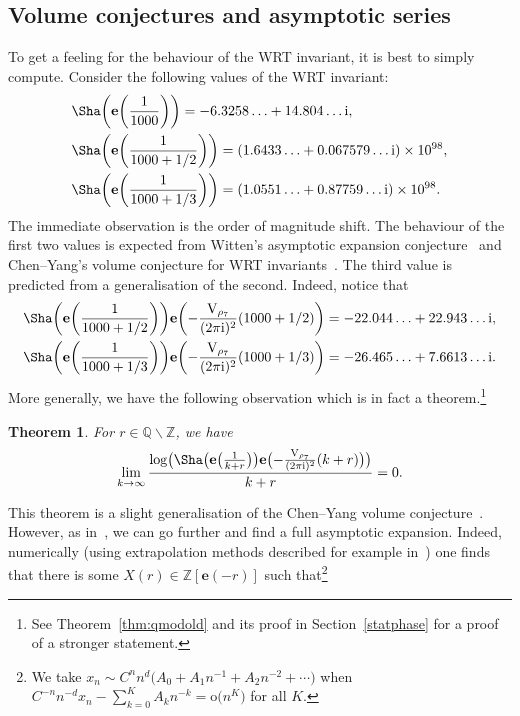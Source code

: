 \documentclass[pdftex]{sigma}
\numberwithin{equation}{section}
\newtheorem{Theorem}{Theorem}[section]
\def\BZ{\mathbb{Z}}
\def\BQ{\mathbb{Q}}
\def\e{\mathbf e}
\def\VC{\mathrm{VC}}
\def\WRT{\Sha}
\def\BZ{\mathbb Z}
\def\BQ{\mathbb Q}
\def\VC{\mathrm{V}}
\begin{document}
\subsection{Volume conjectures and asymptotic series}
\label{volconj}

To get a feeling for the behaviour of the WRT invariant, it is best to simply compute. Consider the following values of the WRT invariant:
\begin{align*}
& \WRT\biggl(\e\biggl(\frac{1}{1000}\biggr)\biggr) =-6.3258\ldots + 14.804\dots {\rm i} ,\\
& \WRT\biggl(\e\biggl(\frac{1}{1000+1/2}\biggr)\biggr) =(1.6433 \ldots + 0.067579\dots {\rm i})\times 10^{98} ,\\
& \WRT\biggl(\e\biggl(\frac{1}{1000+1/3}\biggr)\biggr) =(1.0551\ldots + 0.87759\dots {\rm i})\times 10^{98} .
\end{align*}
The immediate observation is the order of magnitude shift. The behaviour of the first two values is expected from Witten's asymptotic expansion conjecture~\cite{Witten} and Chen--Yang's volume conjecture for WRT invariants~\cite{ChenYang}. The third value is predicted from a generalisation of the second. Indeed, notice that
\begin{align*}
& \WRT\biggl(\e\biggl(\frac{1}{1000+1/2}\biggr)\biggr)\e\biggl(-\frac{\VC_{\rho_7}}{(2\pi {\rm i})^2}(1000+1/2)\biggr) =-22.044\ldots + 22.943\dots {\rm i} ,\\
& \WRT\biggl(\e\biggl(\frac{1}{1000+1/3}\biggr)\biggr)\e\biggl(-\frac{\VC_{\rho_7}}{(2\pi {\rm i})^2}(1000+1/3)\biggr) =-26.465\ldots + 7.6613\dots {\rm i} .
\end{align*}
More generally, we have the following observation which is in fact a theorem.\footnote{See Theorem~\ref{thm:qmodold} and its proof in Section~\ref{statphase} for a proof of a stronger statement.}
\begin{Theorem}
For $r\in\BQ\smallsetminus \BZ$, we have
\begin{align*}
 \lim_{k\rightarrow\infty}\frac{\log\bigl(\WRT\bigl(\e\bigl(\frac{1}{k+r}\bigr)\bigr)\e\bigl(-\frac{\VC_{\rho_7}}{(2\pi {\rm i})^2}(k+r)\bigr)\bigr)}{k+r}
  =0 .
\end{align*}
\end{Theorem}
This theorem is a slight generalisation of the Chen--Yang volume conjecture~\cite{ChenYang}. However, as in~\cite{Ohtsuki:VCYVC}, we can go further and find a full asymptotic expansion. Indeed, numerically (using extrapolation methods described for example in~\cite{GrMoree,Wh:thesis,Zagier:Vas}) one finds that there is some \hbox{$X(r)\in\BZ[\e(-r)]$} such that\footnote{We take $x_n\sim C^nn^d\bigl(A_0+A_1n^{-1}+A_2n^{-2}+\cdots\bigr)$ when $C^{-n}n^{-d}x_n-\sum_{k=0}^{K}A_kn^{-k}=\mathrm{o}\bigl(n^{K}\bigr)$ for all $K$.}
\end{document}

